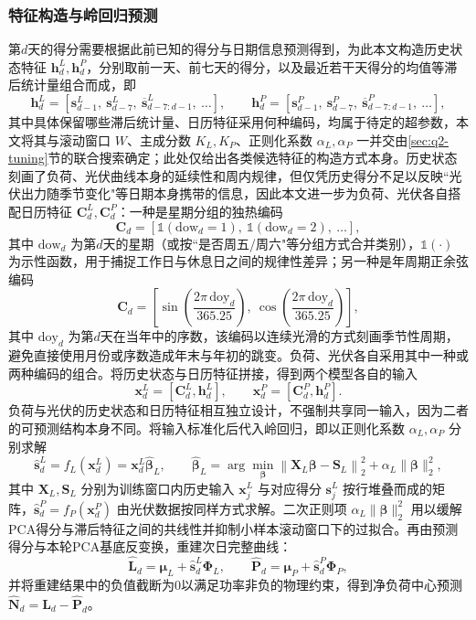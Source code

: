 \subsubsection{特征构造与岭回归预测}
第$d$天的得分需要根据此前已知的得分与日期信息预测得到，为此本文构造历史状态特征 $\bm h_d^L,\bm h_d^P$，分别取前一天、前七天的得分，以及最近若干天得分的均值等滞后统计量组合而成，即
\begin{equation}
\bm h_d^L=[\bm s_{d-1}^L,\ \bm s_{d-7}^L,\ \overline{\bm s}_{d-7:d-1}^L,\ \ldots],\qquad
\bm h_d^P=[\bm s_{d-1}^P,\ \bm s_{d-7}^P,\ \overline{\bm s}_{d-7:d-1}^P,\ \ldots],
\end{equation}
其中具体保留哪些滞后统计量、日历特征采用何种编码，均属于待定的超参数，本文将其与滚动窗口 $W$、主成分数 $K_L,K_P$、正则化系数 $\alpha_L,\alpha_P$ 一并交由\ref{sec:q2-tuning}节的联合搜索确定；此处仅给出各类候选特征的构造方式本身。历史状态刻画了负荷、光伏曲线本身的延续性和周内规律，但仅凭历史得分不足以反映``光伏出力随季节变化"等日期本身携带的信息，因此本文进一步为负荷、光伏各自搭配日历特征 $\bm C_d^L,\bm C_d^P$：一种是星期分组的独热编码
\begin{equation}
\bm C_d=[\mathbb{1}(\mathrm{dow}_d=1),\ \mathbb{1}(\mathrm{dow}_d=2),\ \ldots],
\end{equation}
其中 $\mathrm{dow}_d$ 为第$d$天的星期（或按``是否周五/周六"等分组方式合并类别），$\mathbb{1}(\cdot)$ 为示性函数，用于捕捉工作日与休息日之间的规律性差异；另一种是年周期正余弦编码
\begin{equation}
\bm C_d=\left[\sin\!\left(\frac{2\pi\,\mathrm{doy}_d}{365.25}\right),\ \cos\!\left(\frac{2\pi\,\mathrm{doy}_d}{365.25}\right)\right],
\end{equation}
其中 $\mathrm{doy}_d$ 为第$d$天在当年中的序数，该编码以连续光滑的方式刻画季节性周期，避免直接使用月份或序数造成年末与年初的跳变。负荷、光伏各自采用其中一种或两种编码的组合。将历史状态与日历特征拼接，得到两个模型各自的输入
\begin{equation}
\bm x_d^L=[\bm C_d^L,\bm h_d^L],\qquad \bm x_d^P=[\bm C_d^P,\bm h_d^P].
\end{equation}
负荷与光伏的历史状态和日历特征相互独立设计，不强制共享同一输入，因为二者的可预测结构本身不同。将输入标准化后代入岭回归\cite{ref_ridge}，即以正则化系数 $\alpha_L,\alpha_P$ 分别求解
\begin{equation}
\widehat{\bm s}_d^L=f_L(\bm x_d^L)=\bm x_d^L\widehat{\bm\beta}_L,\qquad
\widehat{\bm\beta}_L=\arg\min_{\bm\beta}\left\|\mathbf X_L\bm\beta-\mathbf S_L\right\|_2^2+\alpha_L\|\bm\beta\|_2^2,
\end{equation}
其中 $\mathbf X_L,\mathbf S_L$ 分别为训练窗口内历史输入 $\bm x_j^L$ 与对应得分 $\bm s_j^L$ 按行堆叠而成的矩阵，$\widehat{\bm s}_d^P=f_P(\bm x_d^P)$ 由光伏数据按同样方式求解。二次正则项 $\alpha_L\|\bm\beta\|_2^2$ 用以缓解PCA得分与滞后特征之间的共线性并抑制小样本滚动窗口下的过拟合。再由预测得分与本轮PCA基底反变换，重建次日完整曲线：
\begin{equation}
\widehat{\bm L}_d=\bm\mu_L+\widehat{\bm s}_d^L\bm\Phi_L,\qquad
\widehat{\bm P}_d=\bm\mu_P+\widehat{\bm s}_d^P\bm\Phi_P,
\end{equation}
并将重建结果中的负值截断为0以满足功率非负的物理约束，得到净负荷中心预测 $\widehat{\bm N}_d=\widehat{\bm L}_d-\widehat{\bm P}_d$。

